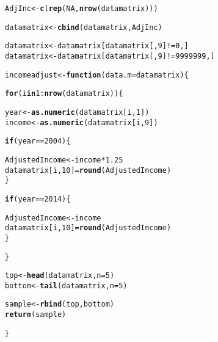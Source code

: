 \documentclass{article}\usepackage[]{graphicx}\usepackage[]{color}
\makeatletter
\newcommand{\hlnum}[1]{\textcolor[rgb]{0.686,0.059,0.569}{#1}}%
\newcommand{\hlopt}[1]{\textcolor[rgb]{0,0,0}{#1}}%
\newcommand{\hlstd}[1]{\textcolor[rgb]{0.345,0.345,0.345}{#1}}%
\newcommand{\hlkwa}[1]{\textcolor[rgb]{0.161,0.373,0.58}{\textbf{#1}}}%
\newcommand{\hlkwb}[1]{\textcolor[rgb]{0.69,0.353,0.396}{#1}}%
\newcommand{\hlkwc}[1]{\textcolor[rgb]{0.333,0.667,0.333}{#1}}%
\newcommand{\hlkwd}[1]{\textcolor[rgb]{0.737,0.353,0.396}{\textbf{#1}}}%
\newenvironment{kframe}{%
 \def\at@end@of@kframe{}%
 \ifinner\ifhmode%
  \def\at@end@of@kframe{\end{minipage}}%
  \begin{minipage}{\columnwidth}%
 \fi\fi%
 \def\FrameCommand##1{\hskip\@totalleftmargin \hskip-\fboxsep
 \colorbox{shadecolor}{##1}\hskip-\fboxsep
     \hskip-\linewidth \hskip-\@totalleftmargin \hskip\columnwidth}%
 \MakeFramed {\advance\hsize-\width
   \@totalleftmargin\z@ \linewidth\hsize
   \@setminipage}}%
 {\par\unskip\endMakeFramed%
 \at@end@of@kframe}
\newenvironment{knitrout}{}{} %
\makeatother
\begin{document}
\begin{knitrout}
\begin{kframe}
\begin{alltt}
\hlstd{AdjInc} \hlkwb{<-} \hlkwd{c}\hlstd{(}\hlkwd{rep}\hlstd{(}\hlnum{NA}\hlstd{,} \hlkwd{nrow}\hlstd{(datamatrix)))}

\hlstd{datamatrix} \hlkwb{<-} \hlkwd{cbind}\hlstd{(datamatrix, AdjInc)}

\hlstd{datamatrix} \hlkwb{<-} \hlstd{datamatrix[datamatrix[,}\hlnum{9}\hlstd{]}\hlopt{!=} \hlnum{0}\hlstd{,]}
\hlstd{datamatrix} \hlkwb{<-} \hlstd{datamatrix[datamatrix[,}\hlnum{9}\hlstd{]}\hlopt{!=} \hlnum{9999999}\hlstd{,]}



\hlstd{incomeadjust} \hlkwb{<-} \hlkwa{function}\hlstd{(}\hlkwc{data.m} \hlstd{= datamatrix)\{}

  \hlkwa{for} \hlstd{(i} \hlkwa{in} \hlnum{1}\hlopt{:}\hlkwd{nrow}\hlstd{(datamatrix))\{}

    \hlstd{year} \hlkwb{<-} \hlkwd{as.numeric}\hlstd{(datamatrix[i,}\hlnum{1}\hlstd{])}
    \hlstd{income} \hlkwb{<-} \hlkwd{as.numeric}\hlstd{(datamatrix[i,}\hlnum{9}\hlstd{])}

    \hlkwa{if} \hlstd{(year} \hlopt{==} \hlnum{2004}\hlstd{)\{}

      \hlstd{AdjustedIncome} \hlkwb{<-} \hlstd{income} \hlopt{*} \hlnum{1.25}
      \hlstd{datamatrix[i,}\hlnum{10}\hlstd{]} \hlkwb{=} \hlkwd{round}\hlstd{(AdjustedIncome)}
    \hlstd{\}}

    \hlkwa{if} \hlstd{(year} \hlopt{==} \hlnum{2014}\hlstd{)\{}

      \hlstd{AdjustedIncome} \hlkwb{<-} \hlstd{income}
      \hlstd{datamatrix[i,}\hlnum{10}\hlstd{]} \hlkwb{=} \hlkwd{round}\hlstd{(AdjustedIncome)}
    \hlstd{\}}


  \hlstd{\}}


  \hlstd{top} \hlkwb{<-} \hlkwd{head}\hlstd{(datamatrix,} \hlkwc{n}\hlstd{=}\hlnum{5}\hlstd{)}
  \hlstd{bottom}\hlkwb{<-} \hlkwd{tail}\hlstd{(datamatrix,} \hlkwc{n}\hlstd{=}\hlnum{5}\hlstd{)}

  \hlstd{sample} \hlkwb{<-} \hlkwd{rbind}\hlstd{(top,bottom)}
  \hlkwd{return}\hlstd{(sample)}

\hlstd{\}}


\end{alltt}
\end{kframe}
\end{knitrout}
\end{document}
